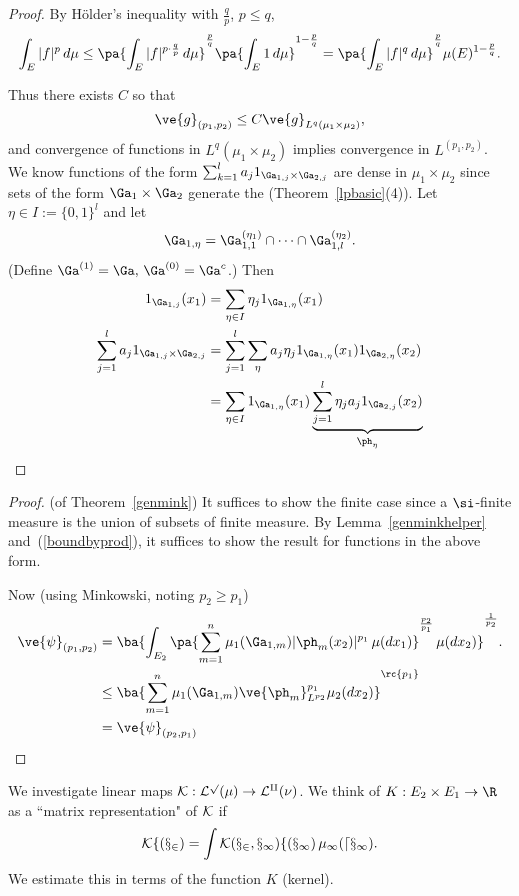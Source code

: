 \begin{proof}
By H\"older's inequality with $\frac qp$, $p\le q$, 
\[
\int _E |f|^p\,d\mu\le \pa{\int_E |f|^{p\cdot \frac qp}\,d\mu}^{\frac pq} \pa{\int_E 1\,d\mu}^{1-\frac{p}{q}}=\pa{\int_E |f|^q\,d\mu}^{\frac pq}\mu(E)^{1-\frac pq}.
\]

Thus there exists $C$ so that
\begin{equation}\label{boundbyprod}
\ve{g}_{(p_1,p_2)}\le C\ve{g}_{L^q(\mu_1\times \mu_2)},
\end{equation}
and convergence of functions in $L^q(\mu_1\times \mu_2)$ implies convergence in $L^{(p_1,p_2)}$. 
We know functions of the form $\sum_{k=1}^l a_j1_{\Ga_{1,j}\times \Ga_{2,j}}$ are dense in $\mu_1\times \mu_2$ since sets of the form $\Ga_1\times\Ga_2$ generate the \sia{} (Theorem~\ref{lpbasic}(4)).
Let $\eta\in I:=\{0,1\}^l$ and let
\[
\Ga_{1,\eta}=\Ga_{1,1}^{(\eta_1)}\cap \cdots \cap \Ga_{1,l}^{(\eta_2)}.
\] 
(Define $\Ga^{(1)}=\Ga,\,\Ga^{(0)}=\Ga^c$.) Then
\begin{align*}
1_{\Ga_{1,j}}(x_1)&=\sum_{\eta\in I} \eta_j 1_{\Ga_{1,\eta}}(x_1)\\
\sum_{j=1}^l a_j1_{\Ga_{1,j}\times \Ga_{2,j}}&=\sum_{j=1}^l \sum_{\eta} a_j\eta_j1_{\Ga_{1,\eta}}(x_1) 1_{\Ga_{2,\eta}}(x_2) \\
&=\sum_{\eta\in I}1_{\Ga_{1,\eta}}(x_1)\underbrace{\sum_{j=1}^l \eta_ja_j1_{\Ga_{2,j}}(x_2)}_{\ph_{\eta}}
\end{align*}
\end{proof}
\begin{proof}(of Theorem~\ref{genmink})
It suffices to show the finite case since a $\si$-finite measure is the union of subsets of finite measure. By Lemma~\ref{genminkhelper} and~(\ref{boundbyprod}), it suffices to show the result for functions in the above form. 

Now (using Minkowski, noting $p_2\ge p_1$)
\begin{align*}
\ve{\psi}_{(p_1,p_2)}
&=
\ba{
\int_{E_2} \pa{
\sum_{m=1}^n
\mu_1(\Ga_{1,m})
|\ph_m(x_2)|^{p_1}\,\mu(dx_1)
}^{\frac{p_2}{p_1}}\,\mu(dx_2)
}^{\frac{1}{p_2}}.\\
&\le \ba{\sum_{m=1}^n \mu_1(\Ga_{1,m})  \ve{\ph_m}^{p_1}_{L^{p_2}}\mu_2(dx_2)}^{\rc{p_1}}\\
&=\ve{\psi}_{(p_2,p_1)}
\end{align*}
\end{proof}
We investigate linear maps $\cal K:L^p(\mu)\to  L^q(\nu)$. %
We think of $K:E_2\times E_1\to \R$ as a ``matrix representation" of $\cal K$ if
\[\cal Kf(x_2)=\int K(x_2,x_1)f(x_1)\,\mu_1(dx_1).\]
We estimate this in terms of the function $K$ (kernel).
